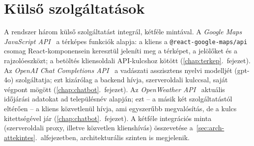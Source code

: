 \section{Külső szolgáltatások}
\label{sec:tech-kulso}

A rendszer három külső szolgáltatást integrál, kétféle mintával. A \emph{Google Maps JavaScript
API}~\cite{gmapsdocs} a térképes funkciók alapja: a kliens a \texttt{@react-google-maps/api}
csomag React-komponensein keresztül jeleníti meg a térképet, a jelölőket és a rajzolóeszközt;
a betöltés kliensoldali API-kulcshoz kötött (\ref{chap:terkep}.~fejezet). Az \emph{OpenAI Chat
Completions API}~\cite{openaidocs} a vadászati asszisztens nyelvi modelljét (gpt-4o)
szolgáltatja; ezt kizárólag a backend hívja, szerveroldali kulccsal, saját végpont mögött
(\ref{chap:chatbot}.~fejezet). Az \emph{OpenWeather API}~\cite{openweatherdocs} aktuális
időjárási adatokat ad településnév alapján; ezt -- a másik két szolgáltatástól eltérően -- a
kliens közvetlenül hívja, ami egyszerűbb megvalósítás, de a kulcs kitettségével jár
(\ref{chap:chatbot}.~fejezet). A kétféle integrációs minta (szerveroldali proxy, illetve
közvetlen klienshívás) összevetése a~\ref{sec:arch-attekintes}.~alfejezetben, architekturális
szinten is megjelenik.
